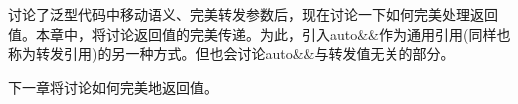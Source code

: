 讨论了泛型代码中移动语义、完美转发参数后，现在讨论一下如何完美处理返回值。本章中，将讨论返回值的完美传递。为此，引入auto\&\&作为通用引用(同样也称为转发引用)的另一种方式。但也会讨论auto\&\&与转发值无关的部分。\par

下一章将讨论如何完美地返回值。\par